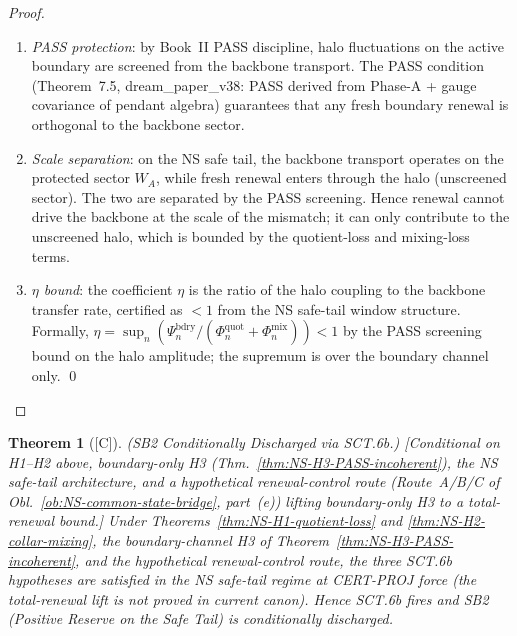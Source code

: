 \documentclass[12pt,oneside]{amsbook}
\theoremstyle{plain}
\newtheorem{theorem}{Theorem}[section]
\theoremstyle{definition}
\theoremstyle{remark}
\newcommand{\status}[1]{\textup{[#1]}}
\begin{document}
\begin{proof}
\begin{enumerate}[label=\textup{(\arabic*)}]
 \item \emph{PASS protection}: by Book~II PASS discipline, halo
 fluctuations on the active boundary are screened from the
 backbone transport. The PASS condition (Theorem~7.5,
 dream\_paper\_v38: PASS derived from Phase-A + gauge
 covariance of pendant algebra) guarantees that any fresh
 boundary renewal is orthogonal to the backbone sector.
 \item \emph{Scale separation}: on the NS safe tail, the
 backbone transport operates on the protected sector $W_A$,
 while fresh renewal enters through the halo (unscreened
 sector). The two are separated by the PASS screening.
 Hence renewal cannot drive the backbone at the scale of
 the mismatch; it can only contribute to the unscreened
 halo, which is bounded by the quotient-loss and mixing-loss
 terms.
 \item \emph{$\eta$ bound}: the coefficient $\eta$ is the
 ratio of the halo coupling to the backbone transfer rate,
 certified as $< 1$ from the NS safe-tail window structure.
 Formally,
 $\eta = \sup_n (\Psi_n^{\mathrm{bdry}} /
 (\Phi_n^{\mathrm{quot}} + \Phi_n^{\mathrm{mix}})) < 1$ by the
 PASS screening bound on the halo amplitude; the supremum is over
 the boundary channel only. \qed
\end{enumerate}
\end{proof}

\begin{theorem}[\status{C}]\label{thm:NS-SB2-discharged}
\textup{(SB2 Conditionally Discharged via SCT.6b.)}
\textup{[Conditional on H1--H2 above, boundary-only H3
(Thm.~\ref{thm:NS-H3-PASS-incoherent}), the NS safe-tail
architecture, \emph{and} a hypothetical renewal-control route
(Route~A/B/C of Obl.~\ref{ob:NS-common-state-bridge}, part~(e))
lifting boundary-only H3 to a total-renewal bound.]}
Under Theorems~\ref{thm:NS-H1-quotient-loss} and
\ref{thm:NS-H2-collar-mixing}, the boundary-channel H3 of
Theorem~\ref{thm:NS-H3-PASS-incoherent}, and the hypothetical
renewal-control route, the three SCT.6b hypotheses are satisfied in
the NS safe-tail regime \emph{at CERT-PROJ force} (the total-renewal
lift is not proved in current canon). Hence SCT.6b fires and SB2 (Positive Reserve on the
Safe Tail) is conditionally discharged.
\end{theorem}
\end{document}
